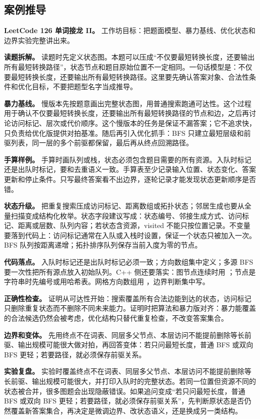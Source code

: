 \subsection{案例推导}

\noindent\textbf{LeetCode 126 单词接龙 II。} 工作坊目标：把题面模型、暴力基线、优化状态和边界实验完整讲出来。

\textbf{读题拆解。} 读题时先定义状态图。本题可以压成“不仅要最短转换长度，还要输出所有最短转换路径”，状态节点和题目原始位置不一定相同。一句话模型是：不仅要最短转换长度，还要输出所有最短转换路径。这里要先确认答案对象、合法性条件和优化目标，不要把题型名字当成推导。

\textbf{暴力基线。} 慢版本先按题意画出完整状态图，用普通搜索跑通可达性。这个过程用于确认不仅要最短转换长度，还要输出所有最短转换路径的节点和边，之后再讨论访问标记、层次或代价顺序。这个慢版本的任务是保证不漏答案；它不追求快，只负责给优化版提供对拍基准。随后再引入优化抓手：BFS 只建立最短层级和前驱列表，同一层的多个前驱都保留，最后再从终点回溯路径。

\textbf{手算样例。} 手算时画队列或栈，状态必须包含题目需要的所有资源。入队时标记还是出队时标记，要和去重语义一致。手算表至少记录输入位置、状态变化、答案更新和停止条件。只写最终答案看不出边界，逐轮记录才能发现状态更新顺序是否错。

\textbf{状态升级。} 把重复搜索压成访问标记、距离数组或拓扑状态；邻居生成也要从全量扫描变成结构化枚举。状态字段建议写成：状态编号、邻接生成方式、访问标记、距离或层数、队列内容；若状态含资源，visited 不能只按位置记录。不变量要落到代码上：访问标记通常在入队或入栈时设置，保证一个状态只被加入一次。BFS 队列按距离递增；拓扑排序队列保存当前入度为零的节点。

\textbf{代码落点。} 入队时标记还是出队时标记必须一致；方向数组集中定义；多源 BFS 要一次性把所有源点放入初始队列。C++ 侧还要落实：图节点连续时用 ；节点是字符串时先编号或用哈希表。网格方向数组用 ，边界判断集中写。

\textbf{正确性检查。} 证明从可达性开始：搜索覆盖所有合法边能到达的状态，访问标记只删除重复状态而不删除不同未来能力。证明时把算法和暴力版对齐：暴力能覆盖的合法候选仍然会被考虑，优化结构只替代重复检查，不改变答案集合。

\textbf{边界和变体。} 先用终点不在词表、同层多父节点、本层访问不能提前删除等长前驱、输出规模可能很大做对拍，再回答变体：若只问最短长度，普通 BFS 或双向 BFS 更轻；若要路径，就必须保存前驱关系。

\textbf{实验复盘。} 实验时覆盖终点不在词表、同层多父节点、本层访问不能提前删除等长前驱、输出规模可能很大，并打印入队时的完整状态。若同一位置但资源不同的状态被合并，很多图题会出现隐蔽错误。如果追问变成“若只问最短长度，普通 BFS 或双向 BFS 更轻；若要路径，就必须保存前驱关系”，先判断原状态是否仍然覆盖新答案集合，再决定是微调边界、改状态语义，还是换成另一类结构。

